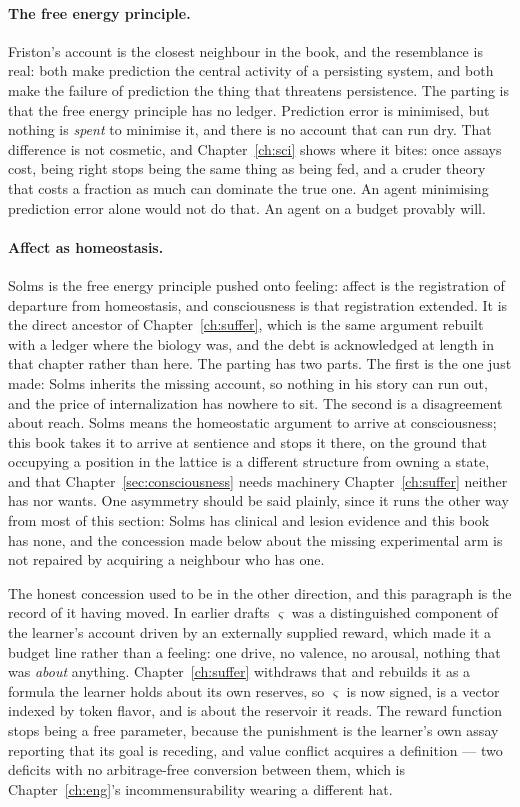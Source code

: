 \paragraph{The free energy principle.}
Friston's account \cite{friston2010free} is the closest neighbour
in the book, and the resemblance is real: both make prediction the
central activity of a persisting system, and both make the failure
of prediction the thing that threatens persistence.
The parting is that the free energy principle has no ledger.
Prediction error is minimised, but nothing is \emph{spent} to
minimise it, and there is no account that can run dry.
That difference is not cosmetic, and Chapter~\ref{ch:sci} shows
where it bites: once assays cost, being right stops being the same
thing as being fed, and a cruder theory that costs a fraction as
much can dominate the true one.
An agent minimising prediction error alone would not do that.
An agent on a budget provably will.

\paragraph{Affect as homeostasis.}
Solms \cite{solms2021} is the free energy principle pushed onto feeling:
affect is the registration of departure from homeostasis, and
consciousness is that registration extended.
It is the direct ancestor of Chapter~\ref{ch:suffer}, which is the same
argument rebuilt with a ledger where the biology was, and the debt is
acknowledged at length in that chapter rather than here.
The parting has two parts.
The first is the one just made: Solms inherits the missing account, so
nothing in his story can run out, and the price of internalization has
nowhere to sit.
The second is a disagreement about reach.
Solms means the homeostatic argument to arrive at consciousness; this
book takes it to arrive at sentience and stops it there, on the ground
that occupying a position in the lattice is a different structure from
owning a state, and that Chapter~\ref{sec:consciousness} needs machinery
Chapter~\ref{ch:suffer} neither has nor wants.
One asymmetry should be said plainly, since it runs the other way from
most of this section: Solms has clinical and lesion evidence and this
book has none, and the concession made below about the missing
experimental arm is not repaired by acquiring a neighbour who has one.

The honest concession used to be in the other direction, and this
paragraph is the record of it having moved.
In earlier drafts $\varsigma$ was a distinguished component of the
learner's account driven by an externally supplied reward, which made it
a budget line rather than a feeling: one drive, no valence, no arousal,
nothing that was \emph{about} anything.
Chapter~\ref{ch:suffer} withdraws that and rebuilds it as a formula the
learner holds about its own reserves, so $\varsigma$ is now signed, is a
vector indexed by token flavor, and is about the reservoir it reads.
The reward function stops being a free parameter, because the punishment
is the learner's own assay reporting that its goal is receding, and value
conflict acquires a definition --- two deficits with no arbitrage-free
conversion between them, which is Chapter~\ref{ch:eng}'s
incommensurability wearing a different hat.

